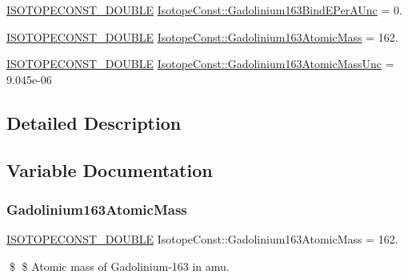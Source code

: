 \begin{DoxyCompactItemize}
\item 
\mbox{\hyperlink{group___isotope_const-_macros_ga8f45a7272ce02c0b4c65c44636ed719a}{I\+S\+O\+T\+O\+P\+E\+C\+O\+N\+S\+T\+\_\+\+D\+O\+U\+B\+LE}} \mbox{\hyperlink{group___isotope_const-_gadolinium-_gd163_gac771f7b78102cbe16f2468925f28ee93}{Isotope\+Const\+::\+Gadolinium163\+Bind\+E\+Per\+A\+Unc}} = 0.
\item 
\mbox{\hyperlink{group___isotope_const-_macros_ga8f45a7272ce02c0b4c65c44636ed719a}{I\+S\+O\+T\+O\+P\+E\+C\+O\+N\+S\+T\+\_\+\+D\+O\+U\+B\+LE}} \mbox{\hyperlink{group___isotope_const-_gadolinium-_gd163_ga71e992342c459090ec79cb45cf110d05}{Isotope\+Const\+::\+Gadolinium163\+Atomic\+Mass}} = 162.
\item 
\mbox{\hyperlink{group___isotope_const-_macros_ga8f45a7272ce02c0b4c65c44636ed719a}{I\+S\+O\+T\+O\+P\+E\+C\+O\+N\+S\+T\+\_\+\+D\+O\+U\+B\+LE}} \mbox{\hyperlink{group___isotope_const-_gadolinium-_gd163_gafc4241997595e9e445828d891d7c0da7}{Isotope\+Const\+::\+Gadolinium163\+Atomic\+Mass\+Unc}} = 9.\+045e-\/06
\end{DoxyCompactItemize}


\subsection{Detailed Description}


\subsection{Variable Documentation}
\mbox{\label{group___isotope_const-_gadolinium-_gd163_ga71e992342c459090ec79cb45cf110d05}} 
\subsubsection{\texorpdfstring{Gadolinium163\+Atomic\+Mass}{Gadolinium163AtomicMass}}
{\footnotesize\ttfamily \mbox{\hyperlink{group___isotope_const-_macros_ga8f45a7272ce02c0b4c65c44636ed719a}{I\+S\+O\+T\+O\+P\+E\+C\+O\+N\+S\+T\+\_\+\+D\+O\+U\+B\+LE}} Isotope\+Const\+::\+Gadolinium163\+Atomic\+Mass = 162.}

\$ \$ Atomic mass of Gadolinium-\/163 in amu. \mbox{\label{group___isotope_const-_gadolinium-_gd163_gafc4241997595e9e445828d891d7c0da7}} 
